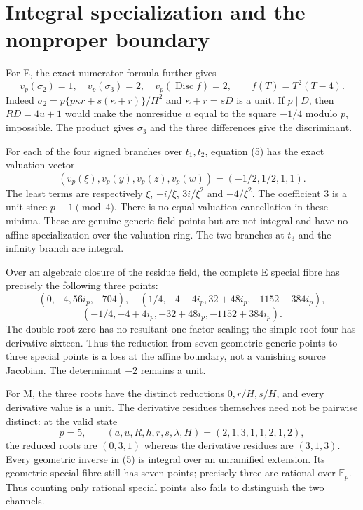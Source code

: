 \section{Integral specialization and the nonproper boundary}
For E, the exact numerator formula further gives
\[
 v_p(\sigma_2)=1,\quad v_p(\sigma_3)=2,\quad
 v_p(\operatorname{Disc} f)=2,
 \qquad\overline f(T)=T^2(T-4).                         \tag{12}
\]
Indeed $\sigma_2=p\{p\kappa r+s(\kappa+r)\}/H^2$ and
$\kappa+r=sD$ is a unit. If $p\mid D$, then $RD=4u+1$ would make the
nonresidue $u$ equal to the square $-1/4$ modulo $p$, impossible.
The product gives $\sigma_3$ and the three differences give the discriminant.

For each of the four signed branches over $t_1,t_2$, equation (5) has the exact
valuation vector
\[
 \boxed{(v_p(\xi),v_p(y),v_p(z),v_p(w))
                  =(-1/2,1/2,1,1).}                   \tag{13}
\]
The least terms are respectively $\xi$, $-i/\xi$, $3i/\xi^2$ and
$-4/\xi^2$. The coefficient $3$ is a unit since $p\equiv1\pmod4$.
There is no equal-valuation cancellation in these minima.
These are genuine generic-field points but are not integral and have no affine
specialization over the valuation ring. The two branches at $t_3$ and the
infinity branch are integral.

Over an algebraic closure of the residue field, the complete E special fibre
has precisely the following three points:
\[
 (0,-4,56i_p,-704),
 \quad(1/4,-4-4i_p,32+48i_p,-1152-384i_p),
\]
\[
 (-1/4,-4+4i_p,-32+48i_p,-1152+384i_p).                  \tag{14}
\]
The double root zero has no resultant-one factor scaling; the simple root four
has derivative sixteen. Thus the reduction from seven geometric generic points
to three special points is a loss at the affine boundary, not a vanishing source
Jacobian. The determinant $-2$ remains a unit.

For M, the three roots have the distinct reductions $0,r/H,s/H$, and every
derivative value is a unit.  The derivative residues themselves need not be
pairwise distinct: at the valid state
\[
 p=5,\qquad(a,u,R,h,r,s,\lambda,H)=(2,1,3,1,1,2,1,2),
\]
the reduced roots are $(0,3,1)$ whereas the derivative residues are
$(3,1,3)$.  Every geometric inverse in (5) is integral over an unramified
extension. Its geometric special fibre still has seven points; precisely
three are rational over $\mathbb F_p$. Thus counting only rational special
points also fails to distinguish the two channels.

